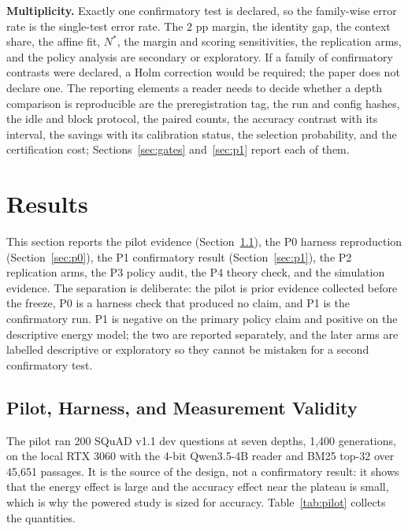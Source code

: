 \documentclass[a4paper,fleqn]{cas-sc}
\begin{document}
\textbf{Multiplicity.} Exactly one confirmatory test is declared, so the family-wise error rate is the single-test error rate. The 2 pp margin, the identity gap, the context share, the affine fit, $N^{*}$, the margin and scoring sensitivities, the replication arms, and the policy analysis are secondary or exploratory. If a family of confirmatory contrasts were declared, a Holm correction would be required; the paper does not declare one. The reporting elements a reader needs to decide whether a depth comparison is reproducible are the preregistration tag, the run and config hashes, the idle and block protocol, the paired counts, the accuracy contrast with its interval, the savings with its calibration status, the selection probability, and the certification cost; Sections~\ref{sec:gates} and~\ref{sec:p1} report each of them.



\section{Results}\label{sec:results}

This section reports the pilot evidence (Section~\ref{sec:pilot}), the P0 harness reproduction (Section~\ref{sec:p0}), the P1 confirmatory result (Section~\ref{sec:p1}), the P2 replication arms, the P3 policy audit, the P4 theory check, and the simulation evidence. The separation is deliberate: the pilot is prior evidence collected before the freeze, P0 is a harness check that produced no claim, and P1 is the confirmatory run. P1 is negative on the primary policy claim and positive on the descriptive energy model; the two are reported separately, and the later arms are labelled descriptive or exploratory so they cannot be mistaken for a second confirmatory test.

\subsection{Pilot, Harness, and Measurement Validity}\label{sec:pilot}

The pilot ran 200 SQuAD v1.1 dev questions at seven depths, 1{,}400 generations, on the local RTX 3060 with the 4-bit Qwen3.5-4B reader and BM25 top-32 over 45{,}651 passages. It is the source of the design, not a confirmatory result: it shows that the energy effect is large and the accuracy effect near the plateau is small, which is why the powered study is sized for accuracy. Table~\ref{tab:pilot} collects the quantities.
\end{document}
